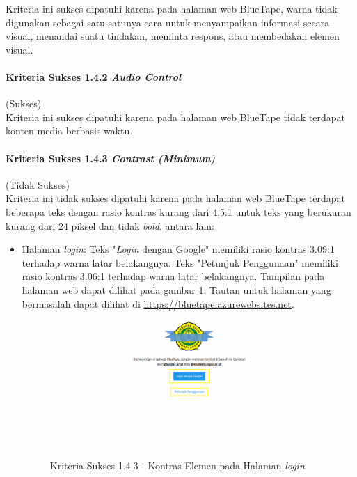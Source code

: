 \documentclass[a4paper,twoside]{article}
\begin{document}
\begin{enumerate}
		Kriteria ini sukses dipatuhi karena pada halaman web BlueTape, warna tidak digunakan sebagai satu-satunya cara untuk menyampaikan informasi secara visual, menandai suatu tindakan, meminta respons, atau membedakan elemen visual.

		\paragraph{Kriteria Sukses 1.4.2 \textit{Audio Control}}
		\label{par:kepatuhan_bluetape_kriteria_sukses_1.4.2}
		(Sukses)\\

		Kriteria ini sukses dipatuhi karena pada halaman web BlueTape tidak terdapat konten media berbasis waktu.

		\paragraph{Kriteria Sukses 1.4.3 \textit{Contrast (Minimum)}}
		\label{par:kepatuhan_bluetape_kriteria_sukses_1.4.3}
		(Tidak Sukses)\\

		Kriteria ini tidak sukses dipatuhi karena pada halaman web BlueTape terdapat beberapa teks dengan rasio kontras kurang dari 4,5:1 untuk teks yang berukuran kurang dari 24 piksel dan tidak \textit{bold}, antara lain:

		\begin{itemize}
			\item Halaman \textit{login}: Teks "\textit{Login} dengan Google" memiliki rasio kontras 3.09:1 terhadap warna latar belakangnya. Teks "Petunjuk Penggunaan" memiliki rasio kontras 3.06:1 terhadap warna latar belakangnya. Tampilan pada halaman web dapat dilihat pada gambar \ref{fig:1.4.3_contrast_minimum_1}. Tautan untuk halaman yang bermasalah dapat dilihat di \url{https://bluetape.azurewebsites.net}.
			\begin{figure}[H]
				\centering  
				\includegraphics[scale=0.3, frame]{kriteria-sukses-1-4-3-contrast-minimum-1}  
				\caption[Kriteria Sukses 1.4.3 - Kontras Elemen pada Halaman \textit{login}]{Kriteria Sukses 1.4.3 - Kontras Elemen pada Halaman \textit{login}}
				\label{fig:1.4.3_contrast_minimum_1}  
			\end{figure} 
			

\end{itemize}
\end{enumerate}
\end{document}
